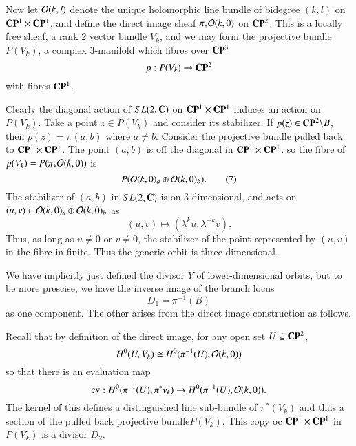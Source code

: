 Now let $\mathcal{O}(k, l)$ denote the unique holomorphic line bundle of bidegree $(k,l)$ on $\mathbf{C}\mathbf{P}^{1}\times \mathbf{C}\mathbf{P}^{1}$, and define the direct image sheaf $\pi_{*}\mathcal{O}(k, 0)$ on $\mathbf{C}\mathbf{P}^{2}$. This is a locally free sheaf, a rank 2 vector bundle $V_{k}$, and we may form the  projective bundle $P(V_{k})$, a complex 3-manifold which fibres over $\mathbf{C}\mathbf{P}^{3}$
$$
p : P(V_{k})\rightarrow \mathbf{C}\mathbf{P}^{2}
$$
with fibres $\mathbf{C}\mathbf{P}^{1}$.

Clearly the diagonal action of $SL(2,\mathbf{C})$ on $\mathbf{C}\mathbf{P}^{1} \times \mathbf{C}\mathbf{P}^{1}$ induces an action on $P(V_{k})$. Take a point $z \in P(V_{k})$ and consider its stabilizer. If $p(z) \in \mathbf{C}\mathbf{P}^{2}\backslash B$, then $p(z) = \pi(a, b)$ where $a\neq b$. Consider the projective bundle pulled back to $\mathbf{C}\mathbf{P}^{1} \times \mathbf{C}\mathbf{P}^{1}$. The point $(a, b)$ is off the diagonal in $\mathbf{C}\mathbf{P}^{1}\times \mathbf{C}\mathbf{P}^{1}$. so the fibre of $p(V_{k}) = P(\pi_{*}\mathcal{O}(k, 0))$ is
\begin{equation*}\label{art7-eq-7}
P(\mathcal{O}(k,0)_{a}\oplus \mathcal{O}(k,0)_{b}).\tag{7}
\end{equation*}
The stabilizer of $(a, b)$ in $SL(2, \mathbf{C})$ is on 3-dimensional, and acts on\break $(u, v) \in \mathcal{O} (k, 0)_{a}\oplus \mathcal{O}(k,0)_{b}$ as
$$
(u, v)\mapsto(\lambda^{k}u, \lambda^{-k}v).
$$
Thus, as long as $u \neq 0$ or $v\neq 0$, the stabilizer of the point represented by $(u, v)$ in the fibre in finite. Thus the generic orbit is three-dimensional.

We have implicitly just defined the divisor $Y$ of lower-dimensional orbits, but to be more prescise, we have the inverse image of the branch locus
$$
D_{1}= \pi^{-1}(B)
$$
as one component. The other arises from the direct image construction as follows.

Recall that by definition of the direct image, for any open set $U\subseteq \mathbf{C}\mathbf{P}^{2}$,
$$
H^{0}(U, V_{k}) \cong H^{0}(\pi^{-1}(U), \mathcal{O}(k, 0))
$$
so that there is an evaluation map
$$
\operatorname{ev}: H^{0}(\pi^{-1}(U), \pi^{*}v_{k})\rightarrow H^{0}(\pi^{-1}(U), \mathcal{O}(k,0)).
$$
The kernel of this defines a distinguished line sub-bundle of $\pi^{*}(V_{k})$ and thus a section of the pulled back projective bundle$P(V_{k})$. This copy oc $\mathbf{C}\mathbf{P}^{1} \times \mathbf{C}\mathbf{P}^{1}$ in $P(V_{k})$ is a divisor $D_{2}$.

